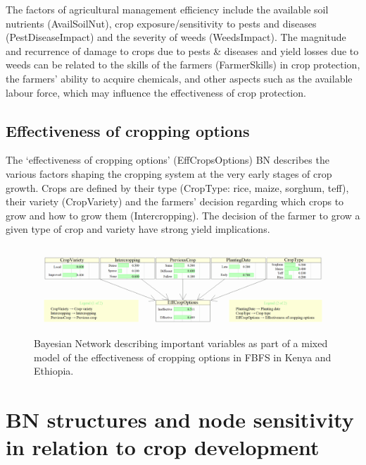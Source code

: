 \documentclass[]{elsarticle} %
\begin{document}
The factors of agricultural management efficiency include the available soil nutrients (AvailSoilNut), crop exposure/sensitivity to pests and diseases (PestDiseaseImpact) and the severity of weeds (WeedsImpact). The magnitude and recurrence of damage to crops due to pests \& diseases and yield losses due to weeds can be related to the skills of the farmers (FarmerSkills) in crop protection, the farmers' ability to acquire chemicals, and other aspects such as the available labour force, which may influence the effectiveness of crop protection.

\hypertarget{refs14}{%
\subsection{Effectiveness of cropping options}\label{refs14}}

The `effectiveness of cropping options' (EffCropsOptions) BN describes the various factors shaping the cropping system at the very early stages of crop growth. Crops are defined by their type (CropType: rice, maize, sorghum, teff), their variety (CropVariety) and the farmers' decision regarding which crops to grow and how to grow them (Intercropping). The decision of the farmer to grow a given type of crop and variety have strong yield implications.

\begin{figure}[!h]

{\centering \includegraphics[width=1\linewidth,]{figures/Modelling_FBFS_Suppl_Effectiveness_of_cropping_options_BNs_plot} 

}

\caption{Bayesian Network describing important variables as part of a mixed model of the effectiveness of cropping options in FBFS in Kenya and Ethiopia.}\label{fig:fig6}
\end{figure}

\hypertarget{refs2}{%
\section{BN structures and node sensitivity in relation to crop development}\label{refs2}}
\end{document}
